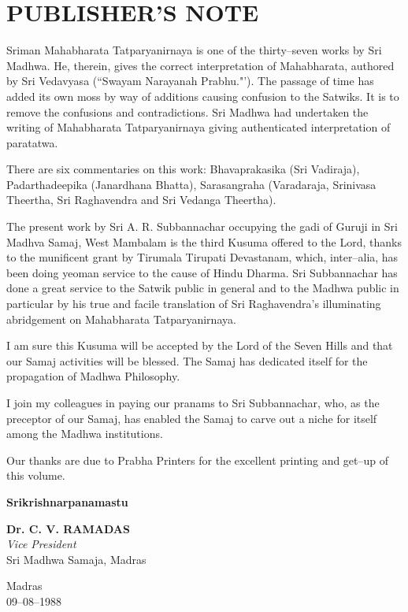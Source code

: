 
\chapter*{PUBLISHER'S NOTE}

Sriman Mahabharata Tatparyanirnaya is one of the thirty–seven works by Sri Madhwa. He, therein, gives the correct interpretation of Mahabharata, authored by Sri Vedavyasa (“Swayam Narayanah Prabhu."'). The passage of time has added its own moss by way of additions causing confusion to the Satwiks. It is to remove the confusions and contradictions. Sri Madhwa had undertaken the writing of Mahabharata Tatparyanirnaya giving authenticated interpretation of paratatwa.

There are six commentaries on this work: Bhavaprakasika (Sri Vadiraja), Padarthadeepika (Janardhana Bhatta), Sarasangraha (Varadaraja, Srinivasa Theertha, Sri Raghavendra and Sri Vedanga Theertha).

The present work by Sri A. R. Subbannachar occupying the gadi of Guruji in Sri Madhva Samaj, West Mambalam is the third Kusuma offered to the Lord, thanks to the munificent grant by Tirumala Tirupati Devastanam, which, inter–alia, has been doing yeoman service to the cause of Hindu Dharma. Sri Subbannachar has done a great service to the Satwik public in general and to the Madhwa public in particular by his true and facile translation of Sri Raghavendra's illuminating abridgement on Mahabharata Tatparyanirnaya.

I am sure this Kusuma will be accepted by the Lord of the Seven Hills and that our Samaj activities will be blessed. The Samaj has dedicated itself for the propagation of Madhwa Philosophy.

I join my colleagues in paying our pranams to Sri Subbannachar, who, as the preceptor of our Samaj, has enabled the Samaj to carve out a niche for itself among the Madhwa institutions.

Our thanks are due to Prabha Printers for the excellent printing and get–up of this volume.

\begin{center}
\textbf{Srikrishnarpanamastu}
\end{center}

\begin{flushright}
\textbf{Dr. C. V. RAMADAS}\\\textit{Vice President}\\ Sri Madhwa Samaja, Madras
\end{flushright}

\begin{flushleft}
Madras \\ 09–08–1988
\end{flushleft}

